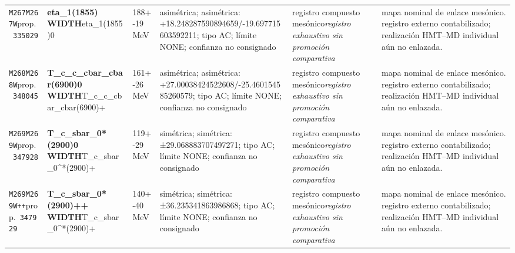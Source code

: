 \begin{landscape}
\begin{longtable}{L{1.85cm}L{4.45cm}L{2.35cm}L{4.05cm}L{3.35cm}L{7.15cm}}
\texttt{M267}\newline \texttt{M267W}\newline prop.\ \texttt{335029} & \textbf{eta\_\allowbreak{}1(1855) WIDTH}\newline eta\_\allowbreak{}1(1855)0 & 188+-19\,MeV & asimétrica; asimétrica: +18.248287590894659/-19.697715603592211; tipo AC; límite NONE; confianza no consignado & registro compuesto mesónico\newline \emph{registro exhaustivo sin promoción comparativa} & mapa nominal de enlace mesónico. registro externo contabilizado; realización HMT--MD individual aún no enlazada. \\
\texttt{M268}\newline \texttt{M268W}\newline prop.\ \texttt{348045} & \textbf{T\_\allowbreak{}c\_\allowbreak{}c\_\allowbreak{}cbar\_\allowbreak{}cbar(6900)0 WIDTH}\newline T\_\allowbreak{}c\_\allowbreak{}c\_\allowbreak{}cbar\_\allowbreak{}cbar(6900)+ & 161+-26\,MeV & asimétrica; asimétrica: +27.00038424522608/-25.460154585260579; tipo AC; límite NONE; confianza no consignado & registro compuesto mesónico\newline \emph{registro exhaustivo sin promoción comparativa} & mapa nominal de enlace mesónico. registro externo contabilizado; realización HMT--MD individual aún no enlazada. \\
\texttt{M269}\newline \texttt{M269W}\newline prop.\ \texttt{347928} & \textbf{T\_\allowbreak{}c\_\allowbreak{}sbar\_\allowbreak{}0*(2900)0 WIDTH}\newline T\_\allowbreak{}c\_\allowbreak{}sbar\_\allowbreak{}0\textasciicircum{}*(2900)+ & 119+-29\,MeV & simétrica; simétrica: ±29.068883707497271; tipo AC; límite NONE; confianza no consignado & registro compuesto mesónico\newline \emph{registro exhaustivo sin promoción comparativa} & mapa nominal de enlace mesónico. registro externo contabilizado; realización HMT--MD individual aún no enlazada. \\
\texttt{M269}\newline \texttt{M269W++}\newline prop.\ \texttt{347929} & \textbf{T\_\allowbreak{}c\_\allowbreak{}sbar\_\allowbreak{}0*(2900)++ WIDTH}\newline T\_\allowbreak{}c\_\allowbreak{}sbar\_\allowbreak{}0\textasciicircum{}*(2900)+ & 140+-40\,MeV & simétrica; simétrica: ±36.235341863986868; tipo AC; límite NONE; confianza no consignado & registro compuesto mesónico\newline \emph{registro exhaustivo sin promoción comparativa} & mapa nominal de enlace mesónico. registro externo contabilizado; realización HMT--MD individual aún no enlazada. \\

\end{longtable}
\end{landscape}
